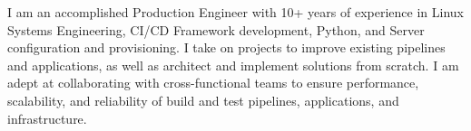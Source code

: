 

\begin{cvparagraph}

I am an accomplished Production Engineer with 10+ years of experience in Linux Systems Engineering, CI/CD Framework development, Python, and Server configuration and provisioning. I take on projects to improve existing pipelines and applications, as well as architect and implement solutions from scratch. I am adept at collaborating with cross-functional teams to ensure performance, scalability, and reliability of build and test pipelines, applications, and infrastructure.
\end{cvparagraph}

